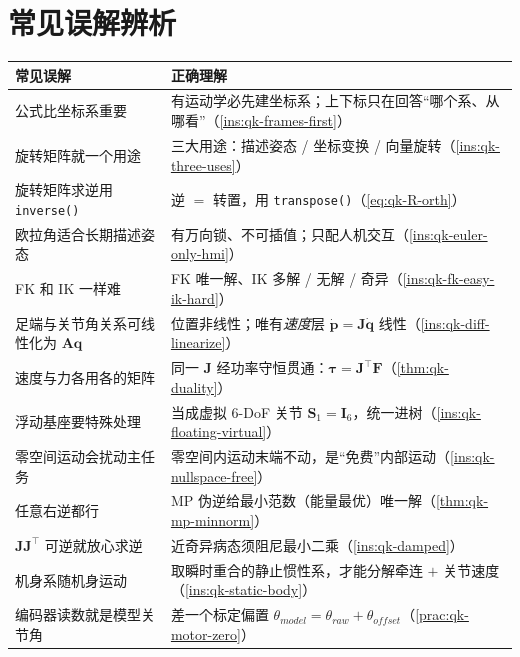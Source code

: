 \section{常见误解辨析}
\label{sec:qk-misconceptions}

\begin{table}[H]\centering\small
\begin{tabular}{p{} p{}}
\toprule
\textbf{常见误解} & \textbf{正确理解} \\
\midrule
公式比坐标系重要 & 有运动学必先建坐标系；上下标只在回答“哪个系、从哪看”（\cref{ins:qk-frames-first}）\\
旋转矩阵就一个用途 & 三大用途：描述姿态 / 坐标变换 / 向量旋转（\cref{ins:qk-three-uses}）\\
旋转矩阵求逆用 \texttt{inverse()} & 逆 $=$ 转置，用 \texttt{transpose()}（\cref{eq:qk-R-orth}）\\
欧拉角适合长期描述姿态 & 有万向锁、不可插值；只配人机交互（\cref{ins:qk-euler-only-hmi}）\\
FK 和 IK 一样难 & FK 唯一解、IK 多解 / 无解 / 奇异（\cref{ins:qk-fk-easy-ik-hard}）\\
足端与关节角关系可线性化为 $\mathbf{A}\boldsymbol{q}$ & 位置非线性；唯有\emph{速度}层 $\dot{\boldsymbol{p}}=\mathbf{J}\dot{\boldsymbol{q}}$ 线性（\cref{ins:qk-diff-linearize}）\\
速度与力各用各的矩阵 & 同一 $\mathbf{J}$ 经功率守恒贯通：$\boldsymbol{\tau}=\mathbf{J}^\top\mathbf{F}$（\cref{thm:qk-duality}）\\
浮动基座要特殊处理 & 当成虚拟 $6$-DoF 关节 $\mathbf{S}_1=\mathbf{I}_6$，统一进树（\cref{ins:qk-floating-virtual}）\\
零空间运动会扰动主任务 & 零空间内运动末端不动，是“免费”内部运动（\cref{ins:qk-nullspace-free}）\\
任意右逆都行 & MP 伪逆给最小范数（能量最优）唯一解（\cref{thm:qk-mp-minnorm}）\\
$\mathbf{J}\mathbf{J}^\top$ 可逆就放心求逆 & 近奇异病态须阻尼最小二乘（\cref{ins:qk-damped}）\\
机身系随机身运动 & 取瞬时重合的静止惯性系，才能分解牵连 $+$ 关节速度（\cref{ins:qk-static-body}）\\
编码器读数就是模型关节角 & 差一个标定偏置 $\theta_{model}=\theta_{raw}+\theta_{offset}$（\cref{prac:qk-motor-zero}）\\
\bottomrule
\end{tabular}
\end{table}

